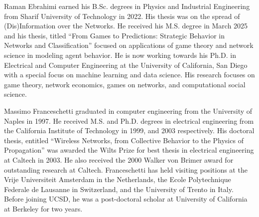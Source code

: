 \documentclass[journal]{IEEEtran}
\begin{document}
\begin{IEEEbiography}{Raman Ebrahimi} earned his B.Sc. degrees in Physics and Industrial Engineering from Sharif University of Technology in 2022. His thesis was on the spread of (Dis)Information over the Networks. He received his M.S. degree in March 2025 and his thesis, titled ``From Games to Predictions: Strategic Behavior in Networks and Classification'' focused on applications of game theory and network science in modeling agent behavior. He is now working towards his Ph.D. in Electrical and Computer Engineering at the University of California, San Diego with a special focus on machine learning and data science. His research focuses on game theory, network economics, games on networks, and computational social science. 
\end{IEEEbiography}
\vspace{-1in}
\begin{IEEEbiography} {Massimo Franceschetti} graduated in computer engineering from the University of Naples in 1997. He received M.S. and Ph.D. degrees in electrical engineering from the California Institute of Technology in 1999, and 2003 respectively. His doctoral thesis, entitled ``Wireless Networks, from Collective Behavior to the Physics of Propagation'' was awarded the Wilts Prize for best thesis in electrical engineering at Caltech in 2003. He also received the 2000 Walker von Brimer award for outstanding research at Caltech. Franceschetti has held visiting positions at the Vrije Universiteit Amsterdam in the Netherlands, the Ecole Polytechnique Federale de Lausanne in Switzerland, and the University of Trento in Italy. Before joining UCSD, he was a post-doctoral scholar at University of California at Berkeley for two years. 
\end{IEEEbiography}
\end{document}
